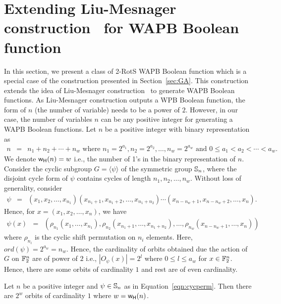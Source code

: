 \documentclass{llncs}
\begin{document}
\section{Extending Liu-Mesnager construction~\cite{DCC:LiuMes19} for WAPB Boolean function}\label{sec:ELM}
In this section, we present a class of 2-RotS WAPB Boolean function which is a special case of the construction presented in Section~\ref{sec:GA}. This construction extends the idea of Liu-Mesnager construction~\cite{DCC:LiuMes19} to generate WAPB Boolean functions. As Liu-Mesnager construction outputs a WPB Boolean function, the form of $n$ (the number of variable) needs to be a power of $2$. However, in our case, the number of variables $n$ can be any positive integer for generating a WAPB Boolean functions. Let $n$ be a positive integer with binary representation as
\begin{eqnarray}\label{eqn:binn}
n & = & n_1 + n_2 + \cdots + n_w \text{ where } n_1 = 2^{a_1}, n_2 = 2^{a_2}, \ldots, n_w = 2^{a_w} \text{ and } 0 \leq a_1 < a_2 < \cdots < a_w.
\end{eqnarray}
We denote $\mathsf{w_H}(n) = w$ i.e., the number of 1's in the binary representation of $n$.
Consider the cyclic subgroup $G = \langle \psi \rangle$ of the symmetric group $\mathbb{S}_n$, where the disjoint cycle form of $\psi$ contains cycles of length $n_1, n_2,  \ldots, n_w$. Without loss of generality, consider 
\begin{eqnarray}\label{eqn:cycperm}
\psi & = & (x_1, x_2, \ldots, x_{n_1}) (x_{n_1+1}, x_{n_1+2}, \ldots, x_{n_1+n_2})\cdots (x_{n-n_w+1}, x_{n-n_w+2}, \ldots, x_n).
\end{eqnarray}
Hence, for $x = (x_1, x_2, \ldots, x_n)$, we have
\begin{eqnarray}\label{eqn:cycperm1}
\psi(x) & = & (\rho_{n_1}(x_1,\ldots,x_{n_1}), \rho_{n_2}(x_{n_1+1},\ldots,x_{n_1+n_2}), \ldots, \rho_{n_w}(x_{n-n_w+1},\ldots,x_n))
\end{eqnarray}
where $\rho_{n_i}$ is the cyclic shift permutation on $n_i$ elements.
Here, $ord(\psi) = 2^{a_w} = n_w$. Hence, the cardinality of orbits obtained due the action of $G$ on $\mathbb{F}_2^n$ are of power of $2$ i.e., $|O_\psi(x)| = 2^l$ where $0 \leq l \leq a_w$ for $x \in \mathbb{F}_2^n$.
Hence, there are some orbits of cardinality $1$ and rest are of even cardinality. 
\begin{lemma}\label{lem:orbNo}
Let $n$ be a positive integer and $\psi \in \mathbb{S}_n$ as in Equation~\ref{eqn:cycperm}. Then there are $2^w$ orbits of cardinality $1$ where $w = \mathsf{w_H}(n)$.
\end{lemma}
\end{document}
